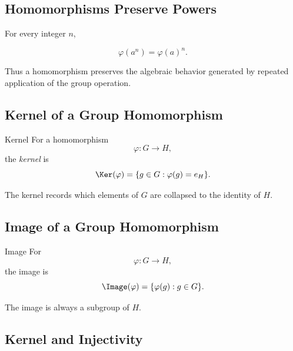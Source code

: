 \subsection{Homomorphisms Preserve Powers}
\label{subsec:homomorphism-powers}

For every integer \(n\),

\[ \varphi(a^n)=\varphi(a)^n. \]

Thus a homomorphism preserves the algebraic behavior generated by repeated
application of the group operation.

\subsection{Kernel of a Group Homomorphism}
\label{subsec:group-kernel}

\begin{definitionbox}{Kernel}
For a homomorphism
\[ \varphi:G\to H, \]
the \emph{kernel} is
\[ \Ker(\varphi)=\{g\in G:\varphi(g)=e_H\}. \]
\end{definitionbox}

The kernel records which elements of \(G\) are collapsed to the identity of
\(H\).

\subsection{Image of a Group Homomorphism}
\label{subsec:group-image}

\begin{definitionbox}{Image}
For
\[ \varphi:G\to H, \]
the image is
\[ \Image(\varphi)=\{\varphi(g):g\in G\}. \]
\end{definitionbox}

The image is always a subgroup of \(H\).

\subsection{Kernel and Injectivity}
\label{subsec:kernel-injectivity-group}

